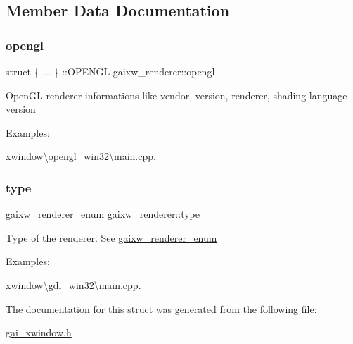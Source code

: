 \subsection{Member Data Documentation}
\mbox{\label{structgaixw__renderer_a166d9e23ab4edbbad58218bc6bf73cb6}} 
\subsubsection{\texorpdfstring{opengl}{opengl}}
{\footnotesize\ttfamily struct \{ ... \} \+::O\+P\+E\+N\+GL  gaixw\+\_\+renderer\+::opengl}

Open\+GL renderer informations like vendor, version, renderer, shading language version \begin{Desc}
\item[Examples\+: ]\par
\hyperlink{xwindow_0Copengl_win32_0Cmain_8cpp-example}{xwindow\textbackslash{}opengl\+\_\+win32\textbackslash{}main.\+cpp}.\end{Desc}
\mbox{\label{structgaixw__renderer_a287bd5241e45837849116cf46c5591ba}} 
\subsubsection{\texorpdfstring{type}{type}}
{\footnotesize\ttfamily \hyperlink{gai__xwindow_8h_a4eae6e51f0425197a4c1010fcc7c8c9d}{gaixw\+\_\+renderer\+\_\+enum} gaixw\+\_\+renderer\+::type}

Type of the renderer. See \hyperlink{gai__xwindow_8h_a4eae6e51f0425197a4c1010fcc7c8c9d}{gaixw\+\_\+renderer\+\_\+enum} \begin{Desc}
\item[Examples\+: ]\par
\hyperlink{xwindow_0Cgdi_win32_0Cmain_8cpp-example}{xwindow\textbackslash{}gdi\+\_\+win32\textbackslash{}main.\+cpp}.\end{Desc}


The documentation for this struct was generated from the following file\+:\begin{DoxyCompactItemize}
\item 
\hyperlink{gai__xwindow_8h}{gai\+\_\+xwindow.\+h}\end{DoxyCompactItemize}
